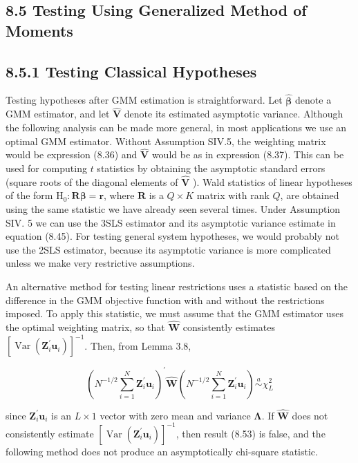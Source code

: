 \documentclass[10pt]{article}
\begin{document}
\subsection*{8.5 Testing Using Generalized Method of Moments}
\subsection*{8.5.1 Testing Classical Hypotheses}
Testing hypotheses after GMM estimation is straightforward. Let $\hat{\boldsymbol{\beta}}$ denote a GMM estimator, and let $\hat{\mathbf{V}}$ denote its estimated asymptotic variance. Although the following analysis can be made more general, in most applications we use an optimal GMM estimator. Without Assumption SIV.5, the weighting matrix would be expression (8.36) and $\hat{\mathbf{V}}$ would be as in expression (8.37). This can be used for computing $t$ statistics by obtaining the asymptotic standard errors (square roots of the diagonal elements of $\hat{\mathbf{V}}$ ). Wald statistics of linear hypotheses of the form $\mathrm{H}_{0}: \mathbf{R} \boldsymbol{\beta}=\mathbf{r}$, where $\mathbf{R}$ is a $Q \times K$ matrix with rank $Q$, are obtained using the same statistic we have already seen several times. Under Assumption SIV. 5 we can use the 3SLS estimator and its asymptotic variance estimate in equation (8.45). For testing general system hypotheses, we would probably not use the 2SLS estimator, because its asymptotic variance is more complicated unless we make very restrictive assumptions.

An alternative method for testing linear restrictions uses a statistic based on the difference in the GMM objective function with and without the restrictions imposed. To apply this statistic, we must assume that the GMM estimator uses the optimal weighting matrix, so that $\hat{\mathbf{W}}$ consistently estimates $\left[\operatorname{Var}\left(\mathbf{Z}_{i}^{\prime} \mathbf{u}_{i}\right)\right]^{-1}$. Then, from Lemma 3.8,


\begin{equation*}
\left(N^{-1 / 2} \sum_{i=1}^{N} \mathbf{Z}_{i}^{\prime} \mathbf{u}_{i}\right)^{\prime} \hat{\mathbf{W}}\left(N^{-1 / 2} \sum_{i=1}^{N} \mathbf{Z}_{i}^{\prime} \mathbf{u}_{i}\right) \stackrel{a}{\sim} \chi_{L}^{2} \tag{8.53}
\end{equation*}


since $\mathbf{Z}_{i}^{\prime} \mathbf{u}_{i}$ is an $L \times 1$ vector with zero mean and variance $\boldsymbol{\Lambda}$. If $\hat{\mathbf{W}}$ does not consistently estimate $\left[\operatorname{Var}\left(\mathbf{Z}_{i}^{\prime} \mathbf{u}_{i}\right)\right]^{-1}$, then result (8.53) is false, and the following method does not produce an asymptotically chi-square statistic.
\end{document}
